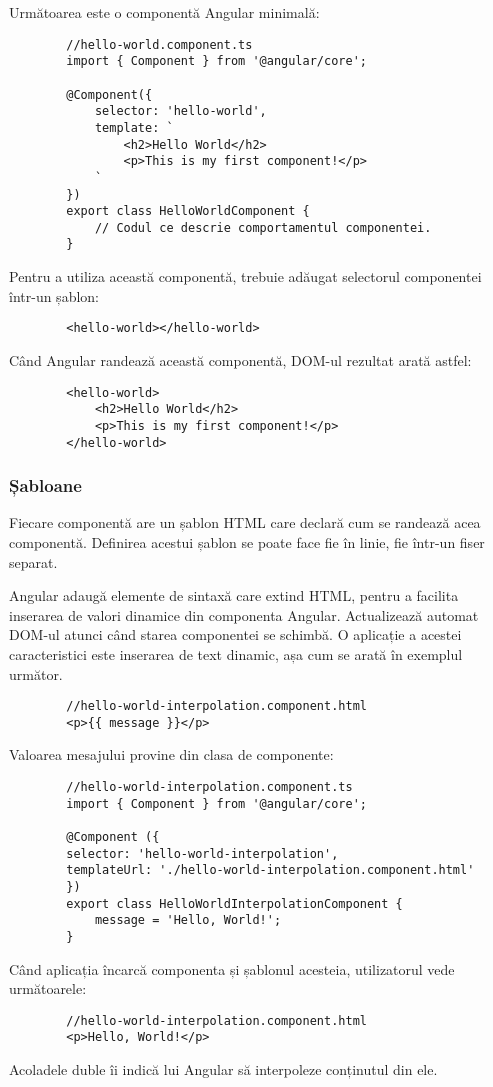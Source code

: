 \documentclass[a4paper,12pt]{article}
\begin{document}
    Următoarea este o componentă Angular minimală:
    \begin{lstlisting}
        //hello-world.component.ts
        import { Component } from '@angular/core';
        
        @Component({
            selector: 'hello-world',
            template: `
                <h2>Hello World</h2>
                <p>This is my first component!</p>
            `
        })
        export class HelloWorldComponent {
            // Codul ce descrie comportamentul componentei.
        }
    \end{lstlisting}

    Pentru a utiliza această componentă, trebuie adăugat selectorul componentei într-un șablon:
    \begin{lstlisting}
        <hello-world></hello-world>
    \end{lstlisting}
    Când Angular randează această componentă, DOM-ul rezultat arată astfel:
    \begin{lstlisting}
        <hello-world>
            <h2>Hello World</h2>
            <p>This is my first component!</p>
        </hello-world>
    \end{lstlisting}

    \subsubsection{Șabloane}
    Fiecare componentă are un șablon HTML care declară cum se randează acea componentă. Definirea acestui șablon se poate face fie în linie, fie într-un fiser separat.

    Angular adaugă elemente de sintaxă care extind HTML, pentru a facilita inserarea de valori dinamice din componenta Angular. Actualizează automat DOM-ul atunci când starea
    componentei se schimbă. O aplicație a acestei caracteristici este inserarea de text dinamic, așa cum se arată în exemplul următor.
    \begin{lstlisting}
        //hello-world-interpolation.component.html
        <p>{{ message }}</p>
    \end{lstlisting}
    Valoarea mesajului provine din clasa de componente:
    \begin{lstlisting}
        //hello-world-interpolation.component.ts
        import { Component } from '@angular/core';

        @Component ({
        selector: 'hello-world-interpolation',
        templateUrl: './hello-world-interpolation.component.html'
        })
        export class HelloWorldInterpolationComponent {
            message = 'Hello, World!';
        }
    \end{lstlisting}
    Când aplicația încarcă componenta și șablonul acesteia, utilizatorul vede următoarele:
    \begin{lstlisting}
        //hello-world-interpolation.component.html
        <p>Hello, World!</p>
    \end{lstlisting}
    Acoladele duble îi indică lui Angular să interpoleze conținutul din ele.
\end{document}
